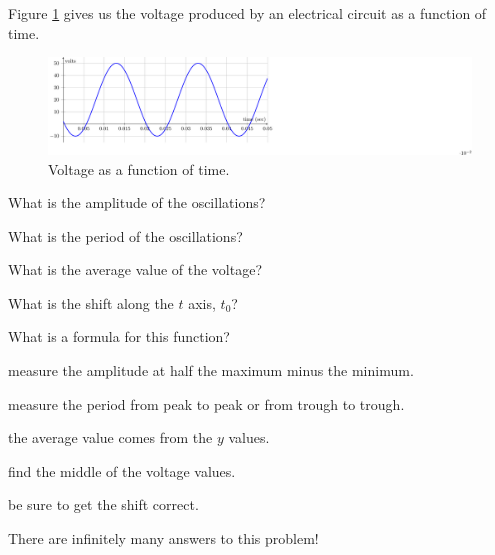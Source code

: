 \begin{activity}\label{A:0.5.1}
    Figure \ref{fig:0.5.A1} gives us the voltage produced by an electrical circuit as a function of time.
    \begin{figure}[ht!]
    \begin{center}
        \includegraphics[trim=0cm 0cm 12cm 0cm, clip, width=0.9\columnwidth]{figures/0-5-fig9.pdf}
    \end{center}
    \caption{Voltage as a function of time.}
    \label{fig:0.5.A1}
\end{figure}


\ba
\item What is the amplitude of the oscillations?  %
\item What is the period of the oscillations? %
\item What is the average value of the voltage?  %
\item What is the shift along the $t$ axis, $t_0$?  %
\item What is a formula for this function?  %
\ea

\end{activity}
\begin{smallhint}
    \ba
        \item measure the amplitude at half the maximum minus the minimum.
        \item measure the period from peak to peak or from trough to trough.
        \item the average value comes from the $y$ values.
        \item find the middle of the voltage values.
        \item be sure to get the shift correct.  
        \item There are infinitely many answers to this
            problem!
    \ea
\end{smallhint}
